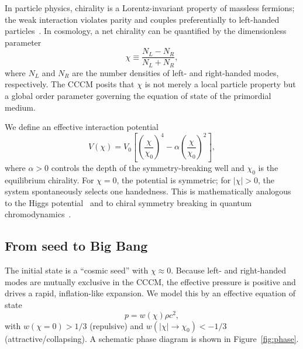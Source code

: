 \documentclass[a4paper,11pt]{article}
\newcommand{\CCCM}{CCCM}
\begin{document}
In particle physics, chirality is a Lorentz-invariant property of massless fermions; the weak interaction violates parity and couples preferentially to left-handed particles~\cite{Peskin1995}. In cosmology, a net chirality can be quantified by the dimensionless parameter
\begin{equation}
    \chi \equiv \frac{N_L - N_R}{N_L + N_R},
    \label{eq:chi}
\end{equation}
where $N_L$ and $N_R$ are the number densities of left- and right-handed modes, respectively. The \CCCM{} posits that $\chi$ is not merely a local particle property but a global order parameter governing the equation of state of the primordial medium.

We define an effective interaction potential
\begin{equation}
    V(\chi) = V_0\left[\left(\frac{\chi}{\chi_0}\right)^4 - \alpha\left(\frac{\chi}{\chi_0}\right)^2\right],
    \label{eq:potential}
\end{equation}
where $\alpha > 0$ controls the depth of the symmetry-breaking well and $\chi_0$ is the equilibrium chirality. For $\chi = 0$, the potential is symmetric; for $|\chi| > 0$, the system spontaneously selects one handedness. This is mathematically analogous to the Higgs potential~\cite{Higgs1964} and to chiral symmetry breaking in quantum chromodynamics~\cite{GellMann1968}.

\subsection{From seed to Big Bang}

The initial state is a ``cosmic seed'' with $\chi \approx 0$. Because left- and right-handed modes are mutually exclusive in the \CCCM, the effective pressure is positive and drives a rapid, inflation-like expansion. We model this by an effective equation of state
\begin{equation}
    p = w(\chi)\rho c^2,
    \label{eq:eos}
\end{equation}
with $w(\chi=0) > 1/3$ (repulsive) and $w(|\chi| \to \chi_0) < -1/3$ (attractive/collapsing). A schematic phase diagram is shown in Figure~\ref{fig:phase}.
\end{document}
